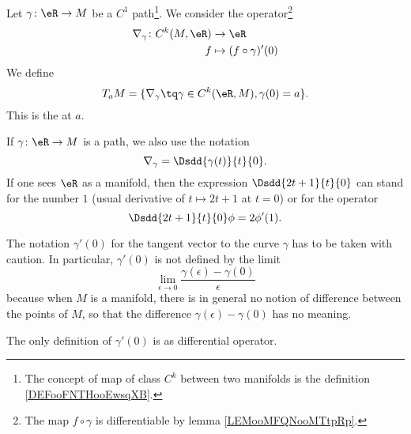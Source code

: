\begin{definition}      \label{DEFooJJVIooDUBwDJ}
	Let \( \gamma\colon \eR\to M\) be a \( C^1\) path\footnote{The concept of map of class \( C^k\) between two manifolds is the definition \ref{DEFooFNTHooEwsqXB}.}. We consider the operator\footnote{The map \( f\circ\gamma\) is differentiable by lemma \ref{LEMooMFQNooMTtpRp}.}
	\begin{equation}
		\begin{aligned}
			\nabla_{\gamma}\colon C^k(M,\eR) & \to \eR                     \\
			f                                & \mapsto (f\circ \gamma)'(0)
		\end{aligned}
	\end{equation}
	We define
	\begin{equation}
		T_aM=\{ \nabla_{\gamma}\tq \gamma\in C^k(\eR,M),\gamma(0)=a \}.
	\end{equation}
	This is the  at \( a\).
\end{definition}

If \( \gamma\colon \eR\to M\) is a path, we also use the notation
\begin{equation}        \label{EQooJQVRooLziKoH}
	\nabla_{\gamma}=\Dsdd{ \gamma(t) }{t}{0}.
\end{equation}
If one sees \( \eR\) as a manifold, then the expression \( \Dsdd{ 2t+1 }{t}{0}\) can stand for the number \( 1\) (usual derivative of \( t\mapsto 2t+1\) at \( t=0\)) or for the operator
\begin{equation}
	\Dsdd{ 2t+1 }{t}{0}\phi=2\phi'(1).
\end{equation}

\begin{remark}      \label{REMooJQFHooQuoZxt}
	The notation \( \gamma'(0)\) for the tangent vector to the curve \( \gamma\) has to be taken with caution. In particular, \( \gamma'(0)\) is not defined by the limit
	\begin{equation}        \label{EQooVMGFooFUCNEY}
		\lim_{\epsilon\to 0} \frac{ \gamma(\epsilon)-\gamma(0) }{ \epsilon }
	\end{equation}
	because when \( M\) is a manifold, there is in general no notion of difference between the points of \( M\), so that the difference \( \gamma(\epsilon)-\gamma(0)\) has no meaning.

	The only definition of \( \gamma'(0)\) is as differential operator.
\end{remark}


